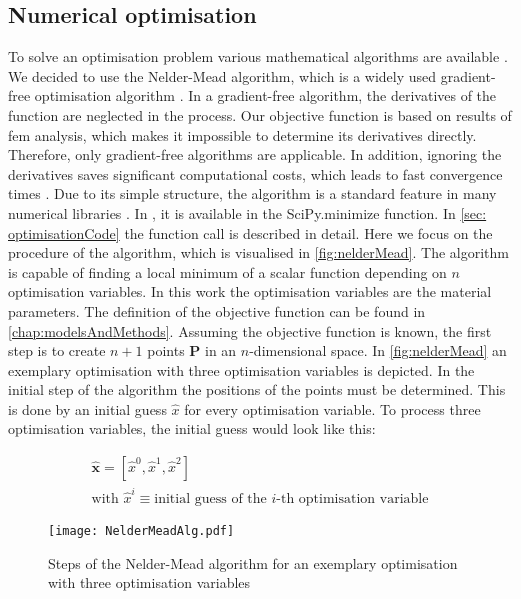 \subsection{Numerical optimisation} \label{subsec: numericaloptimisation}
To solve an optimisation problem various mathematical algorithms are available \cite{rios_derivative-free_2013}. We decided to use the Nelder-Mead algorithm, which is a widely used gradient-free optimisation algorithm \cite{gao_implementing_2012}. In a gradient-free algorithm, the derivatives of the function are neglected in the process. Our objective function is based on results of \acrshort{fem} analysis, which makes it impossible to determine its derivatives directly. Therefore, only gradient-free algorithms are applicable. In addition, ignoring the derivatives saves significant computational costs, which leads to fast convergence times \cite{pham_comparative_2011}. Due to its simple structure, the algorithm is a standard feature in many numerical libraries \cite{singer_efficient_2004}. In , it is available in the SciPy.minimize function. In \autoref{sec: optimisationCode} the function call is described in detail. Here we focus on the procedure of the algorithm, which is visualised in \autoref{fig:nelderMead}. The algorithm is capable of finding a local minimum of a scalar function depending on $n$ optimisation variables.  In this work the optimisation variables are the material parameters. The definition of the objective function can be found in \autoref{chap:modelsAndMethods}. Assuming the objective function is known, the first step is to create $n+1$ points $\mathbf{P}$ in an $n$-dimensional space. In \autoref{fig:nelderMead} an exemplary optimisation with three optimisation variables is depicted. In the initial step of the algorithm the positions of the points must be determined. This is done by an initial guess $\hat{x}$ for every optimisation variable. To process three optimisation variables, the initial guess would look like this: 

\begin{gather}\label{eq:initialPoinsNelderMead}
    \mathbf{\hat{x}} = [\hat{x}^0, \hat{x}^1, \hat{x}^2] \\
    \text{with } \hat{x}^i \equiv \text{initial guess of the $i$-th optimisation variable} \nonumber
\end{gather}

\begin{figure}[H]
    \centering
    \texttt{[image: NelderMeadAlg.pdf]}
    \caption{Steps of the Nelder-Mead algorithm for an exemplary optimisation with three optimisation variables}
    \label{fig:nelderMead}
\end{figure}

